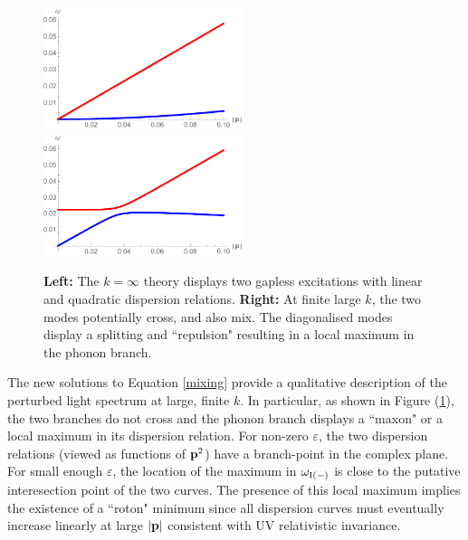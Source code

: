 \begin{figure}[h]
\begin{center}
\includegraphics[width=2.3in]{Chapter_3_Folder_1806.06976/figures/crossing0.pdf}\hspace{0.8in}\includegraphics[width=2.3in]{Chapter_3_Folder_1806.06976/figures/crossing.pdf}
\end{center}
    \caption[This figure shows how the inclusion of a Chern-Simons term causes a level-splitting.]{ {\bf Left:} The $k=\infty$ theory displays two gapless excitations with linear and quadratic dispersion relations. {\bf Right:} At finite large $k$, the two modes potentially cross, and also mix. The diagonalised modes display  a splitting and ``repulsion" resulting in a local maximum in the phonon branch.
}\label{cross}
\end{figure}

The new solutions to Equation \eqref{mixing} provide a qualitative description of the perturbed light spectrum at large, finite $k$.  
In particular, as shown in Figure (\ref{cross}), the two branches do not cross and the phonon branch displays a ``maxon" or a local maximum in its dispersion relation.  
For non-zero $\varepsilon$, the two dispersion relations (viewed as functions of ${\bf p}^2$) have a branch-point in the complex plane. For small enough $\varepsilon$, the location of the maximum in $\omega_{\rm I(-)}$ is close to the putative interesection point of the two curves.
The presence of this local maximum implies the existence of a ``roton" minimum since all dispersion curves must eventually increase linearly at large $|{\bf p}|$ consistent with UV relativistic invariance. 

